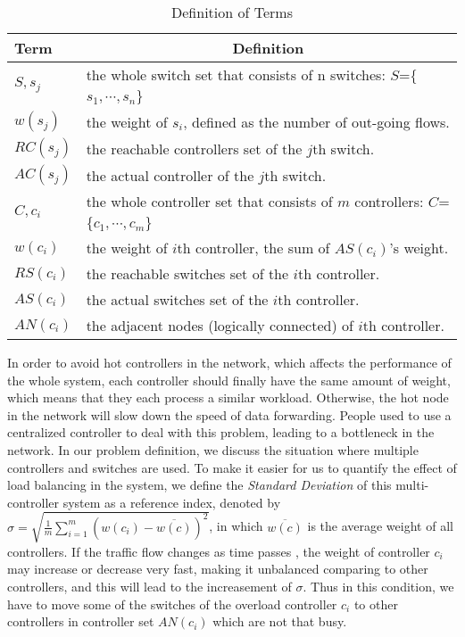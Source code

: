 \begin{table}[htbp]
\centering
\caption{Definition of Terms} \label{table_symbol}
\vspace{1mm}
\begin{tabular}{l|l}
\hline
Term & \multicolumn{1}{c}{Definition}\\
\hline
$S, s_j$& the whole switch set that consists of n switches: $S$=\{$s_1,\cdots,s_n$\}\\
$w(s_j)$& the weight of $s_i$, defined as the number of out-going flows.\\
$RC(s_j)$& the reachable controllers set of the $j$th switch.\\
$AC(s_j)$& the actual controller of the $j$th switch.\\
\hline
$C, c_i$& the whole controller set that consists of $m$ controllers: $C$=\{$c_1,\cdots,c_m$\}\\
$w(c_i)$& the weight of $i$th controller, the sum of $AS(c_i)$'s weight. \\
$RS(c_i)$ & the reachable switches set of the $i$th controller.\\
$AS(c_i)$& the actual switches set of the $i$th controller.\\
$AN(c_i)$& the adjacent nodes (logically connected) of $i$th controller.\\
\hline
\end{tabular}
\end{table}

In order to avoid hot controllers in the network, which affects the performance of the whole system, each controller should finally have the same amount of weight, which means that they each process a similar workload. Otherwise, the hot node in the network will slow down the speed of data forwarding. People used to use a centralized controller to deal with this problem, leading to a bottleneck in the network. In our problem definition, we discuss the situation where multiple controllers and switches are used. To make it easier for us to quantify the effect of load balancing in the system, we define the \emph{Standard Deviation} of this multi-controller system as a reference index, denoted by $\sigma=\sqrt{\frac{1}{m}\sum_{i=1}^{m}(w(c_i)-\overline{w(c)})^2}$, in which $\overline{w(c)}$ is the average weight of all controllers. If the traffic flow changes as time passes , the weight of controller $c_i$ may increase or decrease very fast, making it unbalanced comparing to other controllers, and this will lead to the increasement of $\sigma$. Thus in this condition, we have to move some of the switches of the overload controller $c_i$ to other controllers in controller set $AN(c_i)$ which are not that busy.

